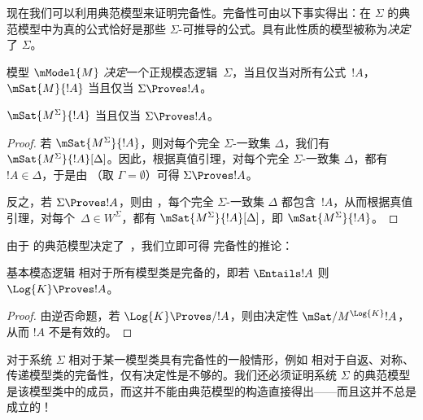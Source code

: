 \documentclass[../../../include/open-logic-section]{subfiles}
\begin{document}


现在我们可以利用典范模型来证明完备性。完备性可由以下事实得出：在 $\Sigma$ 的典范模型中为真的公式恰好是那些 $\Sigma$-可推导的公式。具有此性质的模型被称为\emph{决定}了 $\Sigma$。

\begin{defn}
  模型 $\mModel{M}$ \emph{决定}一个正规模态逻辑~$\Sigma$，当且仅当对所有公式~$!A$，$\mSat{M}{!A}$ 当且仅当 $\Sigma \Proves !A$。
\end{defn}

\begin{thm}[决定性]
   $\mSat{M^\Sigma}{!A}$ 当且仅当 $\Sigma \Proves !A$。
\end{thm}

\begin{proof}
  若 $\mSat{M^\Sigma}{!A}$，则对每个完全 $\Sigma$-一致集 $\Delta$，我们有 $\mSat{M^\Sigma}{!A}[\Delta]$。因此，根据真值引理，对每个完全 $\Sigma$-一致集 $\Delta$，都有 $!A \in \Delta$，于是由 （取 $\Gamma = \emptyset$）可得 $\Sigma \Proves !A$。

  反之，若 $\Sigma \Proves !A$，则由 ，每个完全 $\Sigma$-一致集 $\Delta$ 都包含~$!A$，从而根据真值引理，对每个~$\Delta \in W^\Sigma$，都有 $\mSat{M^\Sigma}{!A}[\Delta]$，即 $\mSat{M^\Sigma}{!A}$。
\end{proof}

由于  的典范模型决定了~，我们立即可得  完备性的推论：

\begin{cor}
  基本模态逻辑  相对于所有模型类是完备的，即若 $\Entails !A$ 则 $\Log{K} \Proves !A$。
\end{cor}

\begin{proof}
  由逆否命题，若 $\Log{K} \Proves/ !A$，则由决定性 $\mSat/{M^{\Log{K}}}{!A}$，从而 $!A$ 不是有效的。
\end{proof}

对于系统 $\Sigma$ 相对于某一模型类具有完备性的一般情形，例如  相对于自返、对称、传递模型类的完备性，仅有决定性是不够的。我们还必须证明系统 $\Sigma$ 的典范模型是该模型类中的成员，而这并不能由典范模型的构造直接得出——而且这并不总是成立的！
\end{document}
